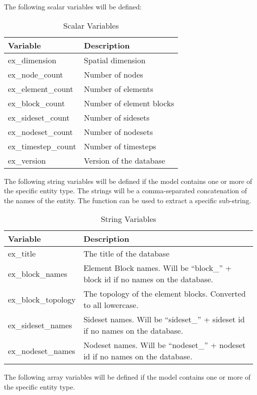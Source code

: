 The following scalar variables will be defined:

\begin{longtable}{lp{4.0in}}
\caption{\exo{} Scalar Variables}\\
Variable              & Description \\
\hline
\endhead
ex\_dimension        & Spatial dimension \\
ex\_node\_count      & Number of nodes \\
ex\_element\_count   & Number of elements \\
ex\_block\_count     & Number of element blocks \\
ex\_sideset\_count   & Number of sidesets \\
ex\_nodeset\_count   & Number of nodesets \\
ex\_timestep\_count  & Number of timesteps \\
ex\_version          & Version of the \exo{} database \\
\hline
\end{longtable}

The following string variables will be defined if the model contains
one or more of the specific entity type.  The strings will be a
comma-separated concatenation of the names of the entity.  The
 function can be used to extract a specific sub-string.

\begin{longtable}{lp{4.0in}}
\caption{\exo{} String Variables}\\
Variable              & Description \\
\hline
\endhead
ex\_title            & The title of the database \\
ex\_block\_names     & Element Block names.  Will be ``block\_'' +
block id if no names on the database. \\
ex\_block\_topology  & The topology of the element blocks.  Converted
to all lowercase. \\
ex\_sideset\_names   & Sideset names.  Will be ``sideset\_'' + sideset
id if no names on the database. \\
ex\_nodeset\_names   & Nodeset names.  Will be ``nodeset\_'' + nodeset
id if no names on the database. \\
\hline
\end{longtable}

The following array variables will be defined if the model contains
one or more of the specific entity type.

